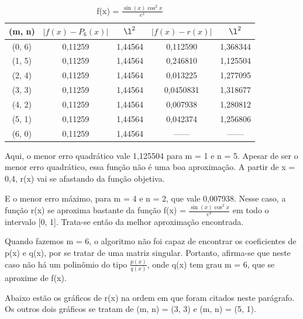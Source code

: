 \documentclass{article}
\begin{document}
    \begin{table}[h]
        \centering
        \caption{f(x) = $\frac{\sin(x)\cos^{2}{x}}{e^{x}}$}
        \label{tab:my_table2}
            \begin{tabular}{|c|c|c|c|c|} \hline 
                 (m, n)&  $\left | f(x) - P_{6}(x) \right |$&  $\l^{2}$&  $ \left |f(x) - r(x) \right |$& $\l^2$\\ \hline 
                 (0, 6)&  0,11259&  1,44564&  0,112590& 1,368344\\ \hline 
                 (1, 5)&  0,11259&  1,44564&  0,246810& 1,125504\\ \hline 
                 (2, 4)&  0,11259&  1,44564&  0,013225& 1,277095\\ \hline 
                 (3, 3)&  0,11259&  1,44564&  0,0450831& 1,318677\\ \hline 
                 (4, 2)&  0,11259&  1,44564&  0,007938& 1,280812\\ \hline 
                 (5, 1)&  0,11259&  1,44564&  0,042374& 1,256806\\ \hline 
                 (6, 0)&  0,11259&  1,44564&  ------& ------\\ \hline
            \end{tabular}
    \end{table}

    Aqui, o menor erro quadrático vale 1,125504 para m = 1 e n = 5. Apesar de ser o menor erro quadrático, essa função
    não é uma boa aproximação. A partir de x = 0,4, r(x) vai se afastando da função objetiva.
    
    E o menor erro máximo, para m = 4 e n = 2, que vale 0,007938. Nesse caso, a função r(x) se aproxima bastante da função
    f(x) = $\frac{\sin(x)\cos^{2}{x}}{e^{x}}$ em todo o intervalo [0, 1]. Trata-se então da melhor aproximação encontrada.
    
    Quando fazemos m = 6, o algoritmo não foi capaz de encontrar os coeficientes de p(x) e q(x), por se tratar de uma
    matriz singular. Portanto, afirma-se que neste caso não há um polinômio do tipo $\frac{p(x)}{q(x)}$, onde q(x) tem grau m = 6, que se aproxime de f(x).
    
    Abaixo estão os gráficos de r(x) na ordem em que foram citados neste parágrafo. Os outros dois gráficos se tratam de (m, n) = (3, 3)
    e (m, n) = (5, 1).
\end{document}
